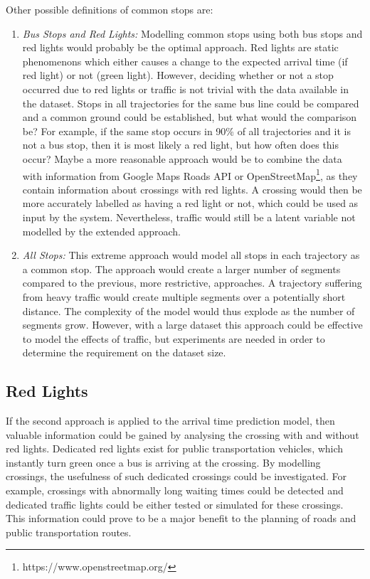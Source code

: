 Other possible definitions of common stops are:
\begin{enumerate}
    \item \textit{Bus Stops and Red Lights:}
    Modelling common stops using both bus stops and red lights would probably be the optimal approach.
    Red lights are static phenomenons which either causes a change to the expected arrival time (if red light) or not (green light).
    However, deciding whether or not a stop occurred due to red lights or traffic is not trivial with the data available in the dataset.
    Stops in all trajectories for the same bus line could be compared and a common ground could be established, but what would the comparison be?
    For example, if the same stop occurs in 90\% of all trajectories and it is not a bus stop, then it is most likely a red light, but how often does this occur?
    Maybe a more reasonable approach would be to combine the data with information from Google Maps Roads API or OpenStreetMap\footnote{https://www.openstreetmap.org/}, as they contain information about crossings with red lights.
    A crossing would then be more accurately labelled as having a red light or not, which could be used as input by the system.  
    Nevertheless, traffic would still be a latent variable not modelled by the extended approach.
    
    \item \textit{All Stops:}
    This extreme approach would model all stops in each trajectory as a common stop.
    The approach would create a larger number of segments compared to the previous, more restrictive, approaches.
    A trajectory suffering from heavy traffic would create multiple segments over a potentially short distance.
    The complexity of the model would thus explode as the number of segments grow.
    However, with a large dataset this approach could be effective to model the effects of traffic, but experiments are needed in order to determine the requirement on the dataset size. 
\end{enumerate}

\subsection{Red Lights}
If the second approach is applied to the arrival time prediction model, then valuable information could be gained by analysing the crossing with and without red lights.
Dedicated red lights exist for public transportation vehicles, which instantly turn green once a bus is arriving at the crossing.
By modelling crossings, the usefulness of such dedicated crossings could be investigated.
For example, crossings with abnormally long waiting times could be detected and dedicated traffic lights could be either tested or simulated for these crossings.
This information could prove to be a major benefit to the planning of roads and public transportation routes. 


